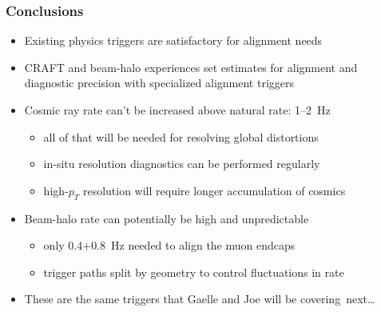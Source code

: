 \documentclass[compress]{beamer}
\begin{document}

\begin{frame}
\frametitle{Conclusions}

\begin{itemize}\setlength{\itemsep}{0.25 cm}
\item Existing physics triggers are satisfactory for alignment needs
\item CRAFT and beam-halo experiences set estimates for alignment
  and diagnostic precision with specialized alignment triggers
\item Cosmic ray rate can't be increased above natural rate: 1--2~Hz
\begin{itemize}\setlength{\itemsep}{0.1 cm}
\item all of that will be needed for resolving global distortions
\item in-situ resolution diagnostics can be performed regularly
\item high-$p_T$ resolution will require longer accumulation of cosmics
\end{itemize}
\item Beam-halo rate can potentially be high and unpredictable
\begin{itemize}\setlength{\itemsep}{0.1 cm}
\item only 0.4$+$0.8~Hz needed to align the muon endcaps
\item trigger paths split by geometry to control fluctuations in rate
\end{itemize}
\item These are the same triggers that Gaelle and Joe will be \mbox{covering next\ldots\hspace{-1 cm}}
\end{itemize}

\label{numpages}
\end{frame}
\end{document}
